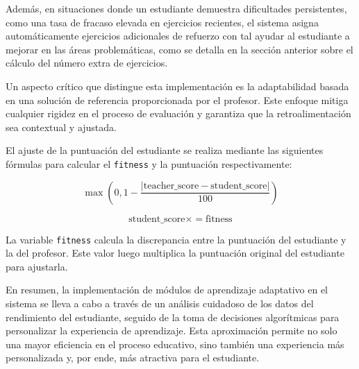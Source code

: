 Además, en situaciones donde un estudiante demuestra dificultades persistentes, como una tasa de fracaso elevada en ejercicios recientes, el sistema asigna automáticamente ejercicios adicionales de refuerzo con tal ayudar al estudiante a mejorar en las áreas problemáticas, como se detalla en la sección anterior sobre el cálculo del número extra de ejercicios.

Un aspecto crítico que distingue esta implementación es la adaptabilidad basada en una solución de referencia proporcionada por el profesor. Este enfoque mitiga cualquier rigidez en el proceso de evaluación y garantiza que la retroalimentación sea contextual y ajustada. 

El ajuste de la puntuación del estudiante se realiza mediante las siguientes fórmulas para calcular el \texttt{fitness} y la puntuación respectivamente:

\begin{equation}
\max\left(0, 1 - \frac{| \text{teacher\_score} - \text{student\_score} |}{100} \right)
\end{equation}

\begin{equation}
\text{student\_score} \times= \text{fitness}
\end{equation}

La variable \texttt{fitness} calcula la discrepancia entre la puntuación del estudiante y la del profesor. Este valor luego multiplica la puntuación original del estudiante para ajustarla. 

En resumen, la implementación de módulos de aprendizaje adaptativo en el sistema se lleva a cabo a través de un análisis cuidadoso de los datos del rendimiento del estudiante, seguido de la toma de decisiones algorítmicas para personalizar la experiencia de aprendizaje. Esta aproximación permite no solo una mayor eficiencia en el proceso educativo, sino también una experiencia más personalizada y, por ende, más atractiva para el estudiante.

